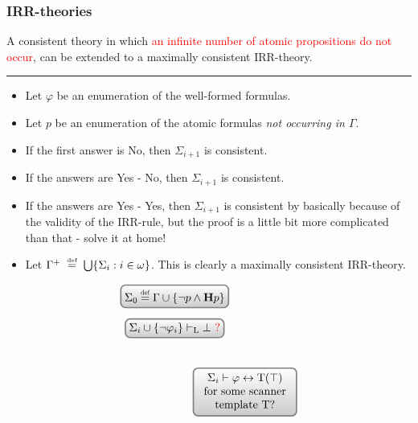 \documentclass[xcolor=x11names]{beamer}
\newcommand{\cemph}[1]{\textcolor{red}{#1}}
\newcommand{\defegy}[1][.1]{\hspace{#1cm}\overset{\textup{\tiny def}}{=}\hspace{#1cm}}
\begin{document}
\begin{frame}[t]
	\frametitle{IRR-theories}
\scriptsize
A consistent theory in which \cemph{an infinite number of atomic propositions do not occur}, can be extended to a maximally consistent IRR-theory.
\medskip
\hrule
\medskip


\begin{minipage}{.5\textwidth}
\begin{itemize}
\item Let $\varphi$ be an enumeration of the well-formed formulas. 
\item Let $p$ be an enumeration of the atomic formulas \emph{not occurring in $\Gamma$}.
\item If the first answer is No, then $\Sigma_{i+1}$ is consistent.
\item If the answers are Yes - No, then $\Sigma_{i+1}$ is consistent.
\item If the answers are Yes - Yes, then $\Sigma_{i+1}$ is consistent by basically because of the validity of the IRR-rule, but the proof is a little bit more complicated than that - solve it at home!
\item Let $\Gamma^+ \defegy \bigcup \{\Sigma_i : i\in \omega\}$. This is clearly a maximally consistent IRR-theory.
\end{itemize}
\end{minipage}
\quad
\begin{minipage}{.4\textwidth}
\[\begin{tikzpicture}[scale=1,>=stealth,
allapot/.style={ rectangle,minimum size=3mm,rounded corners=1.5mm,very thick,draw=black!50,top color=white,bottom color=black!20,
}]
\node[allapot](0) at (0,0){$\Sigma_0 \overset{\scalebox{.6}{def}}{=} \Gamma \cup \{ \lnot p \land \mathbf H p \}$};
\node[allapot](test) at (0,-1){$\Sigma_i \cup \{\lnot \varphi_i\}\vdash_{\mathrm{L}}\bot$ \textcolor{red}{?}};
\node[allapot] (yes-case) at (2.2,-3) {\begin{tabular}c$\Sigma_i \vdash \varphi \leftrightarrow \mathrm T(\top)$ \\ for some scanner \\ template $\mathrm T$?\end{tabular}};

\end{tikzpicture}\]
\end{minipage}
\end{frame}
\end{document}
